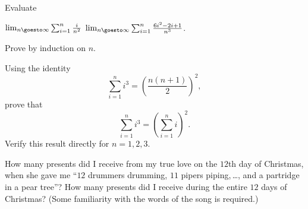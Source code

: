 \begin{exercises}
Evaluate
\begin{exenum}
\x
$\lim_{n\goesto\infty} \sum_{i=1}^n \frac i{n^2}$
\x
$\lim_{n\goesto\infty} \sum_{i=1}^n
\frac{6i^2 - 2i + 1}{n^3}$.
\end{exenum}

Prove  by induction on $n$.

Using the identity
\[
\sum_{i=1}^n i^3 = \left( \frac{n(n+1)}2 \right)^2
,
\]
prove that
\[
\sum_{i=1}^n i^3 = \left( \sum_{i=1}^n i \right)^2
.
\]
Verify this result directly for $n=1,2,3$.

\begin{exenum}
\x
How many presents did I receive from my true love
on the $12$th day of Christmas, when she gave me
``$12$ drummers drumming, $11$ pipers piping,\,\ldots,
and a partridge in a pear tree''?
\x
How many presents did I receive during the entire
$12$ days of Christmas?
(Some familiarity with the words of the song is required.)
\end{exenum}

\end{exercises}
